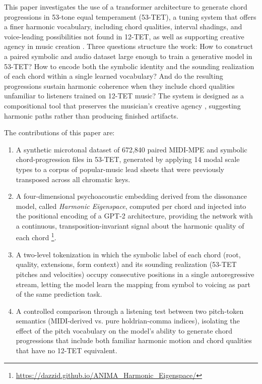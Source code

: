 \documentclass{aimc2026}
\begin{document}
This paper investigates the use of a transformer architecture to generate chord progressions in 53-tone equal temperament (53-TET), a tuning system that offers a finer harmonic vocabulary, including chord qualities, interval shadings, and voice-leading possibilities not found in 12-TET, as well as supporting creative agency in music creation \citep{wiggins2016musical, nielsen2026enacting}. Three questions structure the work: How to construct a paired symbolic and audio dataset large enough to train a generative model in 53-TET? How to encode both the symbolic identity and the sounding realization of each chord within a single learned vocabulary? And do the resulting progressions sustain harmonic coherence when they include chord qualities unfamiliar to listeners trained on 12-TET music? The system is designed as a compositional tool that preserves the musician's creative agency \citep{deguernel2022personalizing}, suggesting harmonic paths rather than producing finished artifacts.

The contributions of this paper are:
\begin{enumerate}
\item A synthetic microtonal dataset of 672,840 paired MIDI-MPE and symbolic chord-progression files in 53-TET, generated by applying 14 modal scale types to a corpus of popular-music lead sheets that were previously transposed across all chromatic keys.

\item A four-dimensional psychoacoustic embedding derived from the \citet{sethares2005tuning} dissonance model, called \textit{Harmonic Eigenspace}, computed per chord and injected into the positional encoding of a GPT-2 architecture, providing the network with a continuous, transposition-invariant signal about the harmonic quality of each chord \footnote{\url{https://dazzid.github.io/ANIMA_Harmonic_Eigenspace/}}.

\item A two-level tokenization in which the symbolic label of each chord (root, quality, extensions, form context) and its sounding realization (53-TET pitches and velocities) occupy consecutive positions in a single autoregressive stream, letting the model learn the mapping from symbol to voicing as part of the same prediction task.

\item A controlled comparison through a listening test between two pitch-token semantics (MIDI-derived vs. pure holdrian-comma indices), isolating the effect of the pitch vocabulary on the model's ability to generate chord progressions that include both familiar harmonic motion and chord qualities that have no 12-TET equivalent. 
\end{enumerate}
\end{document}
